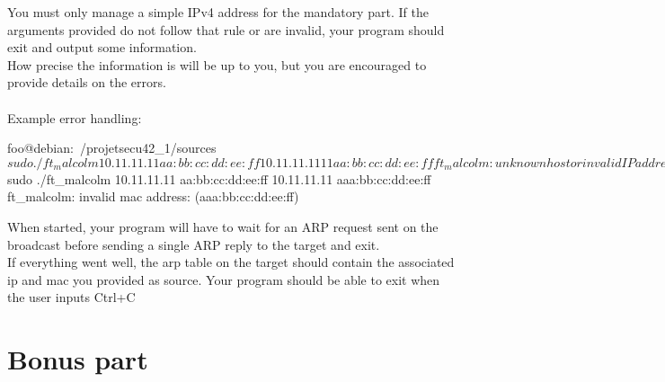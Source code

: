 \documentclass{42-en}
\begin{document}
    You must only manage a simple IPv4 address for the mandatory part.
    If the arguments provided do not follow that rule or are invalid, your program should exit and output some information.\\
    How precise the information is will be up to you, but you are encouraged to provide details on the errors.\\
\\
        Example error handling:
            \begin{42console}
    foo@debian:~/projetsecu42_1/sources$ sudo ./ft_malcolm 10.11.11.11 aa:bb:cc:dd:ee:ff 10.11.11.1111 aa:bb:cc:dd:ee:ff
    ft_malcolm: unknown host or invalid IP address: (10.11.11.1111).

    foo@debian:~/projetsecu42_1/sources$ sudo ./ft_malcolm 10.11.11.11 aa:bb:cc:dd:ee:ff 10.11.11.11 aaa:bb:cc:dd:ee:ff
    ft_malcolm: invalid mac address: (aaa:bb:cc:dd:ee:ff)\end{42console}

    When started, your program will have to wait for an ARP request sent on the broadcast before sending a single ARP reply to the target and exit.\\
    If everything went well, the arp table on the target should contain the associated ip and mac you provided as source.
    Your program should be able to exit when the user inputs Ctrl+C\\


\chapter{Bonus part}
\end{document}
